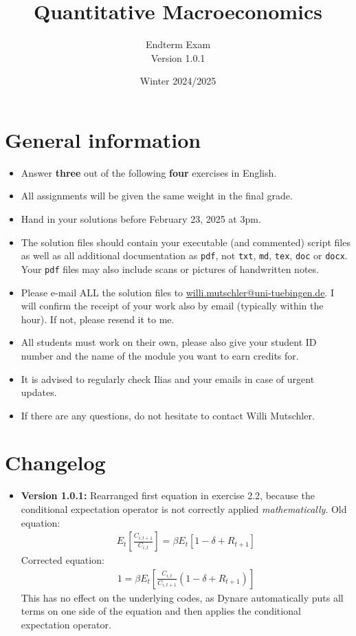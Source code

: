 \documentclass{article}
\begin{document}
	
\title{Quantitative Macroeconomics}
\author{Endterm Exam\\Version 1.0.1}
\date{Winter 2024/2025}

\maketitle

\section*{General information}
\begin{itemize}
	\item Answer \textbf{three} out of the following \textbf{four} exercises in English.
	\item All assignments will be given the same weight in the final grade.
	\item Hand in your solutions before February 23, 2025 at 3pm.
	\item The solution files should contain your executable (and commented) script files
		as well as all additional documentation as \texttt{pdf}, not \texttt{txt}, \texttt{md}, \texttt{tex}, \texttt{doc} or \texttt{docx}.
	Your \texttt{pdf} files may also include scans or pictures of handwritten notes.
	\item Please e-mail ALL the solution files to \url{willi.mutschler@uni-tuebingen.de}.
	I will confirm the receipt of your work also by email (typically within the hour). If not, please resend it to me.
	\item All students must work on their own, please also give your student ID number and the name of the module you want to earn credits for.
	\item It is advised to regularly check Ilias and your emails in case of urgent updates.
	\item If there are any questions, do not hesitate to contact Willi Mutschler.
\end{itemize}

\section*{Changelog}
\begin{itemize}
\item \textbf{Version 1.0.1:} Rearranged first equation in exercise 2.2, because the conditional expectation operator is not correctly applied \emph{mathematically}.
Old equation:
\begin{align*}
E_t\left[ \frac{C_{i,t+1}}{C_{i,t}} \right] = \beta E_t\left[1-\delta + R_{t+1}\right]
\end{align*}
Corrected equation:
\begin{align*}
1 = \beta E_t\left[ \frac{C_{i,t}}{C_{i,t+1}} \left(1-\delta + R_{t+1}\right)\right]
\end{align*}
This has no effect on the underlying codes, as Dynare automatically puts all terms on one side of the equation and then applies the conditional expectation operator.
\end{itemize}
\end{document}
